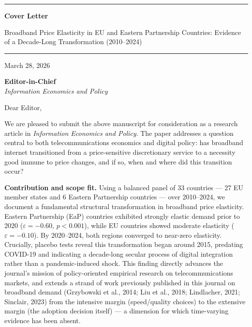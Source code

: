 \documentclass[12pt]{article}
\begin{document}
{\color{accentblue}\rule{\linewidth}{1.5pt}}
\vspace{4pt}

{\large\bfseries\color{accentblue} Cover Letter}

\vspace{2pt}
{\large Broadband Price Elasticity in EU and Eastern Partnership Countries:
Evidence of a Decade-Long Transformation (2010--2024)}

{\color{accentblue}\rule{\linewidth}{0.8pt}}

\vspace{8pt}
\noindent March 28, 2026

\vspace{12pt}
\noindent \textbf{Editor-in-Chief}\\
\textit{Information Economics and Policy}

\vspace{16pt}

Dear Editor,

We are pleased to submit the above manuscript for consideration as a research
article in \textit{Information Economics and Policy}. The paper addresses a
question central to both telecommunications economics and digital policy: has
broadband internet transitioned from a price-sensitive discretionary service to
a necessity good immune to price changes, and if so, when and where did this
transition occur?

\vspace{8pt}
\noindent\textbf{Contribution and scope fit.}\quad
Using a balanced panel of 33 countries --- 27 EU member states and 6 Eastern
Partnership countries --- over 2010--2024, we document a fundamental structural
transformation in broadband price elasticity. Eastern Partnership (EaP)
countries exhibited strongly elastic demand prior to 2020 (\(\varepsilon =
{-}0.60\), \(p < 0.001\)), while EU countries showed moderate elasticity
(\(\varepsilon = {-}0.10\)). By 2020--2024, both regions converged to
near-zero elasticity. Crucially, placebo tests reveal this transformation began
around 2015, predating COVID-19 and indicating a decade-long secular process of
digital integration rather than a pandemic-induced shock. This finding directly
advances the journal's mission of policy-oriented empirical research on
telecommunications markets, and extends a strand of work previously published
in this journal on broadband demand (Grzybowski et al., 2014; Liu et al., 2018;
Lindlacher, 2021; Sinclair, 2023) from the intensive margin (speed/quality
choices) to the extensive margin (the adoption decision itself) --- a dimension
for which time-varying evidence has been absent.
\end{document}
